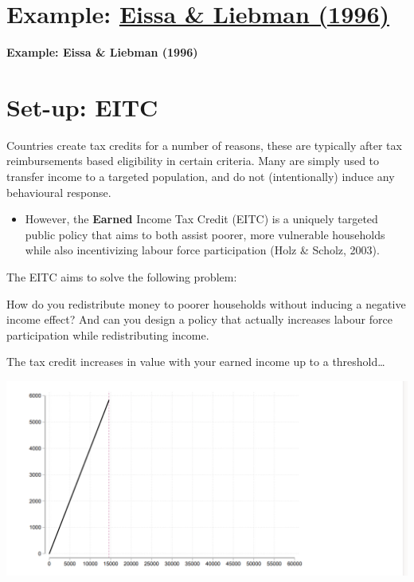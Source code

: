 \documentclass[
  letterpaper,
  DIV=11,
  numbers=noendperiod]{scrreprt}
\providecommand{\tightlist}{%
  \setlength{\itemsep}{0pt}\setlength{\parskip}{0pt}}\usepackage{longtable,booktabs,array}
\theoremstyle{definition}
\theoremstyle{remark}
\begin{document}
\begin{enumerate}
  \section{\texorpdfstring{Example:
  \href{https://www.nber.org/papers/w5158}{Eissa \& Liebman
  (1996)}}{Example: Eissa \& Liebman (1996)}}\label{example-eissa-liebman-1996}

  \textbf{Example: Eissa \& Liebman (1996)}

  \section{Set-up: EITC}\label{set-up-eitc}

  Countries create tax credits for a number of reasons, these are
  typically after tax reimbursements based eligibility in certain
  criteria. Many are simply used to transfer income to a targeted
  population, and do not (intentionally) induce any behavioural
  response.

  \begin{itemize}
  \tightlist
  \item
    However, the \textbf{Earned} Income Tax Credit (EITC) is a uniquely
    targeted public policy that aims to both assist poorer, more
    vulnerable households while also incentivizing labour force
    participation (Holz \& Scholz, 2003).
  \end{itemize}

  The EITC aims to solve the following problem:

  \begin{tcolorbox}[enhanced jigsaw, bottomrule=.15mm, coltitle=black, arc=.35mm, left=2mm, opacityback=0, leftrule=.75mm, colbacktitle=quarto-callout-note-color!10!white, title={Note}, toprule=.15mm, bottomtitle=1mm, breakable, colframe=quarto-callout-note-color-frame, opacitybacktitle=0.6, titlerule=0mm, colback=white, rightrule=.15mm, toptitle=1mm]

  How do you redistribute money to poorer households without inducing a
  negative income effect? And can you design a policy that actually
  increases labour force participation while redistributing income.

  \end{tcolorbox}

  The tax credit increases in value with your earned income up to a
  threshold\ldots{}

  \includegraphics{docs/images/EL1.png}


\end{enumerate}
\end{document}
